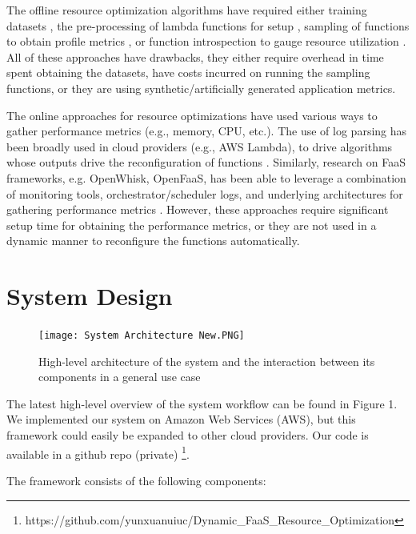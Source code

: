 \documentclass[conference]{IEEEtran}
\begin{document}
The offline resource optimization algorithms have required either training datasets \cite{10.1145/3464298.3493398, 10.1145/3542929.3563468}, the pre-processing of lambda functions for setup \cite{10.1109/INFOCOM48880.2022.9796962, 8567674}, sampling of functions to obtain profile metrics \cite{10.1145/3542929.3563464}, or function introspection to gauge resource utilization \cite{s23187829, 9336272}. All of these approaches have drawbacks, they either require overhead in time spent obtaining the datasets, have costs incurred on running the sampling functions, or they are using synthetic/artificially generated application metrics.

The online approaches for resource optimizations have used various ways to gather performance metrics (e.g., memory, CPU, etc.). The use of log parsing has been broadly used in cloud providers (e.g., AWS Lambda), to drive algorithms whose outputs drive the reconfiguration of functions \cite{10063937, 9860980}. Similarly, research on FaaS frameworks, e.g. OpenWhisk, OpenFaaS, has been able to leverage a combination of monitoring tools, orchestrator/scheduler logs, and underlying architectures for gathering performance metrics \cite{9582234, 10.1145/3472883.3486992, 9946331}. However, these approaches require significant setup time for obtaining the performance metrics, or they are not used in a dynamic manner to reconfigure the functions automatically.


\section{System Design}

\begin{figure}
    \centering
    \texttt{[image: System Architecture New.PNG]}
    \caption{High-level architecture of the system and the interaction
between its components in a general use case}
    \label{fig:enter-label}
\end{figure}

The latest high-level overview of the system workflow can be found in Figure 1. We implemented our system on Amazon Web Services (AWS), but this framework could easily be expanded to other cloud providers. Our code is available in a github repo (private) \footnote{https://github.com/yunxuanuiuc/Dynamic\_FaaS\_Resource\_Optimization}. 

The framework consists of the following components:
\end{document}
